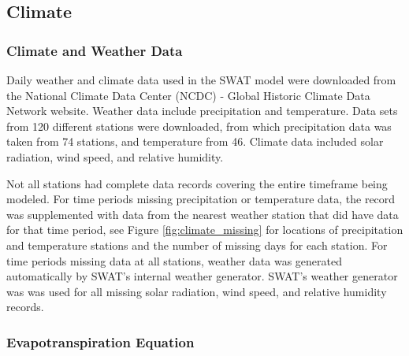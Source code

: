 \subsection{Climate}	\label{sec:climate}

\subsubsection{Climate and Weather Data}

Daily weather and climate data used in the SWAT model were downloaded from the National Climate Data Center (NCDC) - Global Historic Climate Data Network website. Weather data include precipitation and temperature.  Data sets from 120 different stations were downloaded, from which precipitation data was taken from 74 stations, and temperature from 46. Climate data included solar radiation, wind speed, and relative humidity.   

Not all stations had complete data records covering the entire timeframe being modeled.  For time periods missing precipitation or temperature data, the record was supplemented with data from the nearest weather station that did have data for that time period, see Figure \ref{fig:climate_missing} for locations of precipitation and temperature stations and the number of missing days for each station.   For time periods missing data at all stations, weather data was generated automatically by SWAT's internal weather generator.  SWAT's weather generator was was used for all missing solar radiation, wind speed, and relative humidity records. 

\subsubsection{Evapotranspiration Equation}


